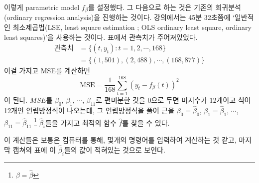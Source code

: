 \documentclass{article}
\begin{document}
이렇게 parametric model \(f_\beta\)를 설정했다.
그 다음으로 하는 것은 기존의 회귀분석(ordinary regression analysis)을 진행하는 것이다.
강의에서는 45분 32초쯤에 `일반적인 최소제곱법(LSE, least square estimation ; OLS ordinary least square, ordinary least squares)'을 사용하는 것이다.
표에서 관측치가 주어져있었다.
\begin{equation}\label{observations}
\begin{aligned}
\text{관측치}
&=\{(t,y_t):t=1,2,\cdots,168\}\\
&=\{(1,501), (2,488),\cdots,(168,877)\}
\end{aligned}
\end{equation}
이걸 가지고 MSE를 계산하면
\begin{equation}\label{MSE}
\text{MSE}=\frac1{168}\sum_{t=1}^{168}\left(y_t-f_\beta(t)\right)^2
\end{equation}
이 된다.
\(MSE\)를 \(\beta_0\), \(\beta_1\), \(\cdots\), \(\beta_{11}\)로 편미분한 것을 0으로 두면 미지수가 12개이고 식이 12개인 연립방정식이 나오는데, 그 연립방정식을 풀어 근을 \(\beta_0=\hat\beta_0\), \(\beta_1=\hat\beta_1\), \(\cdots\), \(\beta_{11}=\hat\beta_{11}\) \footnote{\(\beta=\hat\beta\)} \(\hat\beta_i\)들을 가지고 최적의 함수 \(\hat f\)를 찾을 수 있다.

이 계산들은 보통은 컴퓨터를 통해, 몇개의 명령어를 입력하여 계산하는 것 같고, 마지막 캡쳐의 표에 이 \(\hat\beta_i\)들의 값이 적혀있는 것으로 보인다.

\end{document}
